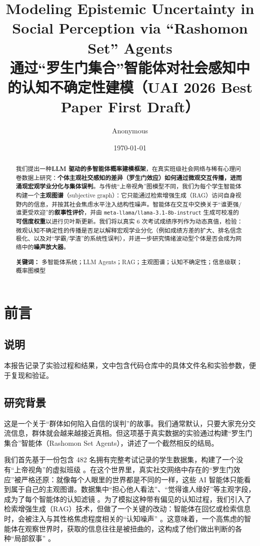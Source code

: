 \documentclass[UTF8, a4paper, 11pt]{ctexart}
\title{\textbf{Modeling Epistemic Uncertainty in Social Perception via ``Rashomon Set'' Agents\\通过“罗生门集合”智能体对社会感知中的认知不确定性建模（UAI 2026 Best Paper First Draft）}}
\author{Anonymous}
\date{\today}
\begin{document}
\maketitle

\begin{abstract}
我们提出一种\textbf{LLM 驱动的多智能体概率建模框架}，在真实班级社会网络与稀有心理问卷数据上研究：\textbf{个体主观社交感知的差异（罗生门效应）如何通过微观交互传播，进而涌现宏观学业分化与集体误判}。与传统“上帝视角”图模型不同，我们为每个学生智能体构建一个\textbf{主观图谱}（subjective graph）：它只能通过检索增强生成（RAG）访问自身视野内的信息，并按其社会焦虑水平注入结构性噪声。智能体在交互中交换关于“谁更强/谁更受欢迎”的\textbf{叙事性评价}，并由 \texttt{meta-llama/llama-3.1-8b-instruct} 生成可校准的\textbf{可信度权重}以进行贝叶斯更新。我们将以真实 6 次考试成绩序列作为动态真值，检验：微观认知不确定性的传播是否足以解释宏观学业分化（例如成绩方差的扩大、排名信念极化、以及对“学霸/学渣”的系统性误判），并进一步研究情绪波动型个体是否会成为网络中的\textbf{噪声放大器}。

\textbf{关键词：} 多智能体系统；LLM Agents；RAG；主观图谱；认知不确定性；信息级联；概率图模型
\end{abstract}

\section{前言}

\subsection{说明}
本报告记录了实验过程和结果，文中包含代码仓库中的具体文件名和实验参数，便于复现和验证。

\subsection{研究背景}

这是一个关于“群体如何陷入自信的误判”的故事。我们通常默认，只要大家充分交流信息，群体就会越来越接近真相。但这项基于真实数据的实验通过构建“罗生门集合”智能体（Rashomon Set Agents），讲述了一个截然相反的结局。

我们首先基于一份包含 482 名拥有完整考试记录的学生数据集，构建了一个没有“上帝视角”的虚拟班级 。在这个世界里，真实社交网络中存在的“罗生门效应”被严格还原：就像每个人眼里的世界都是不同的一样，这些 AI 智能体只能看到属于自己的主观图谱。数据集中“担心他人看法”、“觉得谁人缘好”等主观字段，成为了每个智能体的认知滤镜 。为了模拟这种带有偏见的认知过程，我们引入了检索增强生成（RAG）技术，但做了一个关键的改动：智能体在回忆或检索信息时，会被注入与其性格焦虑程度相关的“认知噪声” 。这意味着，一个高焦虑的智能体在观察世界时，获取的信息往往是被扭曲的，这构成了他们做出判断的各种“局部叙事” 。
\end{document}
